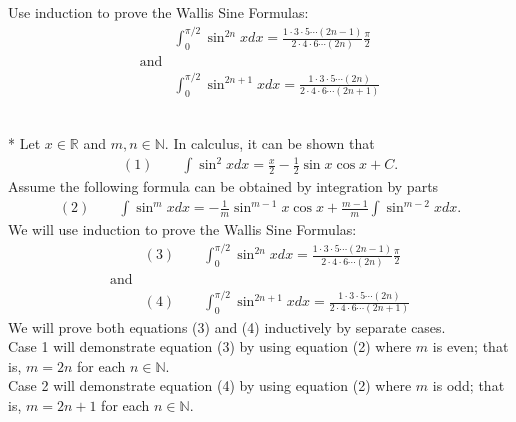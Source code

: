 \documentclass[10pt]{article}
\makeatletter
\newcommand{\N}{\mathbb{N}}
\newcommand{\R}{\mathbb{R}}
\newenvironment{question}[2][Question]{\begin{trivlist}
\item[\hskip \labelsep {\bfseries #1}\hskip \labelsep {\bfseries #2.}]}{\end{trivlist}}
\renewenvironment{proof}[1][\proofname]{\par
\pushQED{\qed}
\normalfont \topsep6\p@\@plus6\p@\relax
\trivlist
\item[\hskip\labelsep\itshape#1\@addpunct{.}]\mbox{}\\*}{\popQED\endtrivlist\@endpefalse}
\makeatother
\begin{document}
\newpage
\begin{question}{2}
	Use induction to prove the Wallis Sine Formulas:
	\begin{align*}
		 & \int_0^{\pi / 2} \sin^{2n} x dx = \frac{1 \cdot 3 \cdot 5 \cdots (2n-1)}{2 \cdot 4 \cdot 6 \cdots (2n)} \frac{\pi}{2}   \\
		\text{and}                                                                                                                 \\
		 & \int_0^{\pi / 2} \sin^{2n+1} x dx = \frac{1 \cdot 3 \cdot 5 \cdots (2n)}{2 \cdot 4 \cdot 6 \cdots (2n+1)} 
	\end{align*}

	\begin{proof}
		Let $x \in \R$ and $m, n \in \N$.
		In calculus, it can be shown that
		\begin{align*}
			(1) \qquad \int \sin^2 x dx = \frac x 2 - \frac 1 2 \sin x \cos x + C.
		\end{align*}
		Assume the following formula can be obtained by integration by parts
		\begin{align*}
			(2) \qquad \int \sin^m x dx = - \frac 1 m \sin^{m-1} x \cos x + \frac{m - 1}{m} \int \sin^{m-2} xdx.
		\end{align*}
		We will use induction to prove the Wallis Sine Formulas:
		\begin{align*}
			 & (3) \qquad \int_0^{\pi / 2} \sin^{2n} x dx = \frac{1 \cdot 3 \cdot 5 \cdots (2n-1)}{2 \cdot 4 \cdot 6 \cdots (2n)} \frac{\pi}{2}   \\
			\text{and}                                                                                                                            \\
			 & (4) \qquad \int_0^{\pi / 2} \sin^{2n+1} x dx = \frac{1 \cdot 3 \cdot 5 \cdots (2n)}{2 \cdot 4 \cdot 6 \cdots (2n+1)} 
		\end{align*}
		\noindent
		We will prove both equations (3) and (4) inductively by separate cases. \\ Case 1 will demonstrate equation (3) by using equation (2) where $m$ is even; that is, $m = 2n$ for each $n \in \N$. \\ Case 2 will demonstrate equation (4) by using equation (2) where $m$ is odd; that is, $m = 2n + 1$ for each $n \in \N$.


\end{proof}
\end{question}
\end{document}
